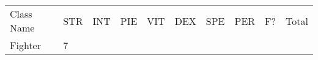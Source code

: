 \documentclass[12pt]{article}
\begin{document}
\begin{longtable}[]{@{}llllllllll@{}}
\toprule
\begin{minipage}[t]{0.13\columnwidth}\raggedright\strut
Class Name
\strut\end{minipage} &
\begin{minipage}[t]{0.06\columnwidth}\raggedright\strut
STR
\strut\end{minipage} &
\begin{minipage}[t]{0.06\columnwidth}\raggedright\strut
INT
\strut\end{minipage} &
\begin{minipage}[t]{0.06\columnwidth}\raggedright\strut
PIE
\strut\end{minipage} &
\begin{minipage}[t]{0.06\columnwidth}\raggedright\strut
VIT
\strut\end{minipage} &
\begin{minipage}[t]{0.06\columnwidth}\raggedright\strut
DEX
\strut\end{minipage} &
\begin{minipage}[t]{0.06\columnwidth}\raggedright\strut
SPE
\strut\end{minipage} &
\begin{minipage}[t]{0.06\columnwidth}\raggedright\strut
PER
\strut\end{minipage} &
\begin{minipage}[t]{0.07\columnwidth}\raggedright\strut
F?
\strut\end{minipage} &
\begin{minipage}[t]{0.08\columnwidth}\raggedright\strut
Total
\strut\end{minipage}\tabularnewline
\begin{minipage}[t]{0.13\columnwidth}\raggedright\strut
Fighter
\strut\end{minipage} &
\begin{minipage}[t]{0.06\columnwidth}\raggedright\strut
7
\strut\end{minipage} &
\begin{minipage}[t]{0.06\columnwidth}\raggedright\strut
\strut\end{minipage} &
\begin{minipage}[t]{0.06\columnwidth}\raggedright\strut
\strut\end{minipage} &
\begin{minipage}[t]{0.06\columnwidth}\raggedright\strut
\strut\end{minipage} &
\begin{minipage}[t]{0.06\columnwidth}\raggedright\strut

\end{minipage}
\end{longtable}
\end{document}
